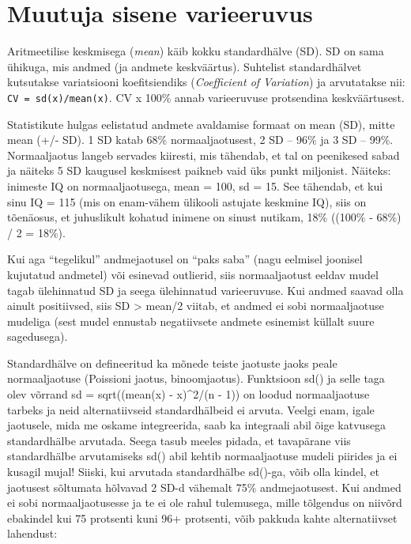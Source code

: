 \documentclass[]{book}
\begin{document}
\section*{Muutuja sisene varieeruvus}\label{muutuja-sisene-varieeruvus}

Aritmeetilise keskmisega (\emph{mean}) käib kokku standardhälve (SD). SD
on sama ühikuga, mis andmed (ja andmete keskväärtus). Suhtelist
standardhälvet kutsutakse variatsiooni koefitsiendiks (\emph{Coefficient
of Variation}) ja arvutatakse nii: \texttt{CV\ =\ sd(x)/mean(x)}. CV x
100\% annab varieeruvuse protsendina keskväärtusest.

Statistikute hulgas eelistatud andmete avaldamise formaat on mean (SD),
mitte mean (+/- SD). 1 SD katab 68\% normaaljaotusest, 2 SD -- 96\% ja 3
SD -- 99\%. Normaaljaotus langeb servades kiiresti, mis tähendab, et tal
on peenikesed sabad ja näiteks 5 SD kaugusel keskmisest paikneb vaid üks
punkt miljonist. Näiteks: inimeste IQ on normaaljaotusega, mean = 100,
sd = 15. See tähendab, et kui sinu IQ = 115 (mis on enam-vähem ülikooli
astujate keskmine IQ), siis on tõenäosus, et juhuslikult kohatud inimene
on sinust nutikam, 18\% ((100\% - 68\%) / 2 = 18\%).

Kui aga ``tegelikul'' andmejaotusel on ``paks saba'' (nagu eelmisel
joonisel kujutatud andmetel) või esinevad outlierid, siis normaaljaotust
eeldav mudel tagab ülehinnatud SD ja seega ülehinnatud varieeruvuse. Kui
andmed saavad olla ainult positiivsed, siis SD \textgreater{} mean/2
viitab, et andmed ei sobi normaaljaotuse mudeliga (sest mudel ennustab
negatiivsete andmete esinemist küllalt suure sagedusega).

Standardhälve on defineeritud ka mõnede teiste jaotuste jaoks peale
normaaljaotuse (Poissioni jaotus, binoomjaotus). Funktsioon sd() ja
selle taga olev võrrand sd = sqrt((mean(x) - x)\^{}2/(n - 1)) on loodud
normaaljaotuse tarbeks ja neid alternatiivseid standardhälbeid ei
arvuta. Veelgi enam, igale jaotusele, mida me oskame integreerida, saab
ka integraali abil õige katvusega standardhälbe arvutada. Seega tasub
meeles pidada, et tavapärane viis standardhälbe arvutamiseks sd() abil
kehtib normaaljaotuse mudeli piirides ja ei kusagil mujal! Siiski, kui
arvutada standardhälbe sd()-ga, võib olla kindel, et jaotusest sõltumata
hõlvavad 2 SD-d vähemalt 75\% andmejaotusest. Kui andmed ei sobi
normaaljaotusesse ja te ei ole rahul tulemusega, mille tõlgendus on
niivõrd ebakindel kui 75 protsenti kuni 96+ protsenti, võib pakkuda
kahte alternatiivset lahendust:
\end{document}
